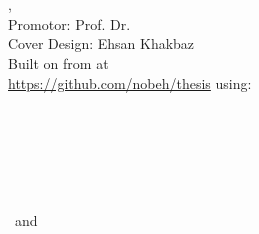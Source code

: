 \hfill
\vfill
{
	\small
	\textbf{\thesisName} \\
	\textit{\thesisTitle} \\
	\thesisSubject, \thesisDate \\
	Promotor: Prof. Dr. \thesisFirstReviewer \\
	Cover Design: Ehsan Khakbaz  \\[2em]
	Built on \jtt{\gitAuthorIsoDate} from \jtt{\gitHash} at \\
	\url{https://github.com/nobeh/thesis} using: \\[1.5em]
	\pdftexbanner \\[2em]
	\textbf{\thesisUniversity} \\
	\textit{\thesisUniversityGroup} \\
	\thesisUniversityInstitute \\
	\thesisUniversityDepartment \\
	\thesisUniversityStreetAddress \\
	\thesisUniversityPostalCode\ and \thesisUniversityCity
}
